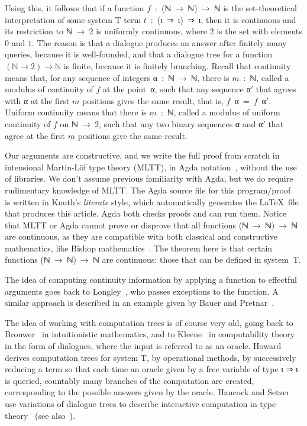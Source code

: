 \documentclass{entcs} \usepackage{prentcsmacro}
\newcommand{\AgdaC}[1]{\mbox{#1}}
\begin{document}
Using this, it follows that if a function \AgdaC{$f$ : (ℕ → ℕ) → ℕ} is
the set-theoretical interpretation of some system T term \AgdaC{$t$ :
(ι ⇒ ι) ⇒ ι}, then it is continuous and its restriction to \AgdaC{ℕ →
2} is uniformly continuous, where $2$ is the set with elements $0$ and
$1$. The reason is that a dialogue produces an answer after finitely
many queries, because it is well-founded, and that a dialogue tree for
a function \AgdaC{$(ℕ → 2) → ℕ$} is finite, because it is finitely
branching. Recall that continuity means that, for any sequence of
integers \AgdaC{α : ℕ → ℕ}, there is \AgdaC{$m$ : ℕ}, called a modulus
of continuity of $f$ at the point~α, such that any sequence
\AgdaC{α$'$} that agrees with α at the first $m$ positions gives the
same result, that is, \AgdaC{$f$ α = $f$ α$'$}.  Uniform continuity
means that there is \AgdaC{$m$ : ℕ}, called a modulus of uniform
continuity of $f$ on \AgdaC{ℕ → 2}, such that any two binary sequences
α and α$'$ that agree at the first $m$ positions give the same result.


Our arguments are constructive, and we write the full proof from
scratch in intensional Martin-Löf type theory (MLTT), in Agda
notation~\cite{bove:dybjer}, without the use of libraries.  We don't
assume previous familiarity with Agda, but we do require rudimentary
knowledge of MLTT.  The Agda source file for this
program/proof~\cite{escardo:dialogue} is written in Knuth's
\emph{literate} style, which automatically generates the \LaTeX\ file
that produces this article. Agda both checks proofs and can run them.
Notice that MLTT or Agda cannot prove or disprove that all functions
\AgdaC{(ℕ → ℕ) → ℕ} are continuous, as they are compatible with both
classical and constructive mathematics, like Bishop
mathematics~\cite{bishop:foundations}. The theorem here is that
certain functions \AgdaC{(ℕ → ℕ) → ℕ} are continuous: those that can
be defined in system~T.

The idea of computing continuity information by applying a function
to effectful arguments goes back to Longley~\cite{Longley99whenis},
who passes exceptions to the function. A similar approach is
described in an example given by Bauer and Pretnar~\cite{bauer:pretnar}.

The idea of working with computation trees is of course very old,
going back to Brouwer~\cite{beeson} in intuitionistic mathematics, and
to Kleene~\cite{KleeneSC:rfqftI} in computability theory in the form
of dialogues, where the input is referred to as an
oracle. Howard~\cite{Howard(80)} derives computation trees for system
T, by operational methods, by successively reducing a term so that
each time an oracle given by a free variable of type ι ⇒ ι is
queried, countably many branches of the computation are created,
corresponding to the possible answers given by the oracle.
Hancock and Setzer use variations of dialogue trees to describe
interactive computation in type
theory~\cite{DBLP:conf/csl/HancockS00} (see also~\cite{Hancock_representationsof}).
\end{document}
